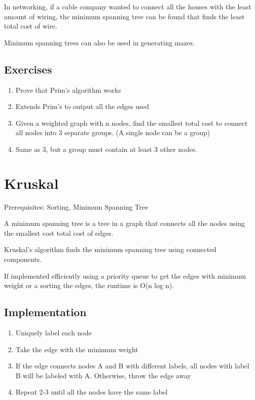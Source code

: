 \documentclass[11pt,oneside]{book}
\begin{document}
In networking, if a cable company wanted to connect all the houses with the least amount of wiring, the minimum spanning tree can be found that finds the least total cost of wire.

Minimum spanning trees can also be used in generating mazes.

\subsection{Exercises}

\begin{enumerate}
\item Prove that Prim's algorithm works
\item Extends Prim's to output all the edges used
\item Given a weighted graph with n nodes, find the smallest total cost to connect all nodes into 3 separate groups. (A single node can be a group)
\item Same as 3, but a group must contain at least 3 other nodes.
\end{enumerate}

        \section{ Kruskal }
        

Prerequisites:  Sorting, Minimum Spanning Tree

A minimum spanning tree is a tree in a graph that connects all the nodes using the smallest cost total cost of edges.

Kruskal's algorithm finds the minimum spanning tree using connected components.

If implemented efficiently using a priority queue to get the edges with minimum weight or a sorting the edges, the runtime is O(n log n).

\subsection{Implementation}

\begin{enumerate}
\item Uniquely label each node
\item Take the edge with the minimum weight
\item If the edge connects nodes A and B with different labels, all nodes with label B will be labeled with A. Otherwise, throw the edge away
\item Repeat 2-3 until all the nodes have the same label
\end{enumerate}
\end{document}
